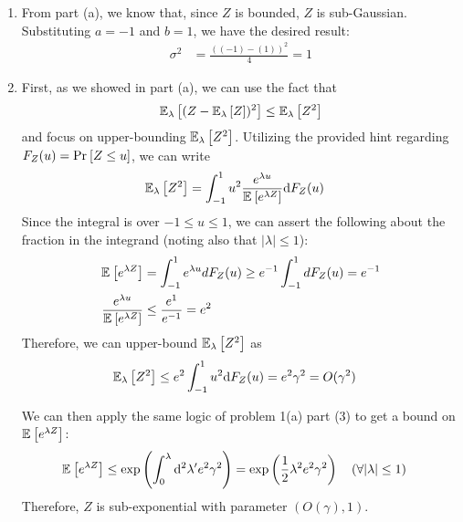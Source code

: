\documentclass[11pt]{article}
\newcommand{\1}{\mathbb{I}} %
\begin{document}
\begin{enumerate}
	\item From part (a), we know that, since $Z$ is bounded, $Z$ is sub-Gaussian. Substituting $a=-1$ and $b=1$, we have the desired result:
	\begin{align}
		\sigma^2
			&= \frac{((-1) - (1))^2}{4} = 1
	\end{align}



	\item First, as we showed in part (a), we can use the fact that
	\begin{align}
		\E[\lambda]{(Z - \E[\lambda]{Z})^2} \leq \E[\lambda]{Z^2}
	\end{align}
	and focus on upper-bounding $\E[\lambda]{Z^2}$. Utilizing the provided hint regarding $F_Z(u) = \Prob{Z \leq u}$, we can write
	\begin{align}
		\E[\lambda]{Z^2} 
			&= \int_{-1}^{1} u^2 \frac{  e^{\lambda u} }{ \E{e^{\lambda Z}}  } \mathrm{d}F_Z(u)
	\end{align}
	Since the integral is over $-1 \leq u \leq 1$, we can assert the following about the fraction in the integrand (noting also that $|\lambda| \leq 1$):
	\begin{align}
		\E{e^{\lambda Z}} 
			&= \int_{-1}^{1} e^{\lambda u} dF_Z(u) \geq e^{-1} \int_{-1}^{1} dF_Z(u) = e^{-1} \\
		\frac{  e^{\lambda u} }{ \E{e^{\lambda Z}}  }  
			&\leq \frac{e^{1} }{ e^{-1} } = e^2 
	\end{align}
	Therefore, we can upper-bound $\E[\lambda]{Z^2}$ as
	\begin{align}
		\E[\lambda]{Z^2} 
			&\leq e^2 \int_{-1}^{1} u^2 \mathrm{d}F_Z(u) = e^2 \gamma^2  = O(\gamma^2)
	\end{align}

	We can then apply the same logic of problem 1(a) part (3) to get a bound on $\E{e^{\lambda Z}}$:
	\begin{align}
		\E{e^{\lambda Z}} 
			&\leq \exp\lr{   \int_{0}^{\lambda} \mathrm{d}^2\lambda' e^2 \gamma^2 } = \exp\lr{  \onehalf \lambda^2e^2\gamma^2 } 
			\quad (\forall |\lambda| \leq 1)
	\end{align}
	Therefore, $Z$ is sub-exponential with parameter $(O(\gamma), 1)$. 
	

\end{enumerate}
\end{document}
